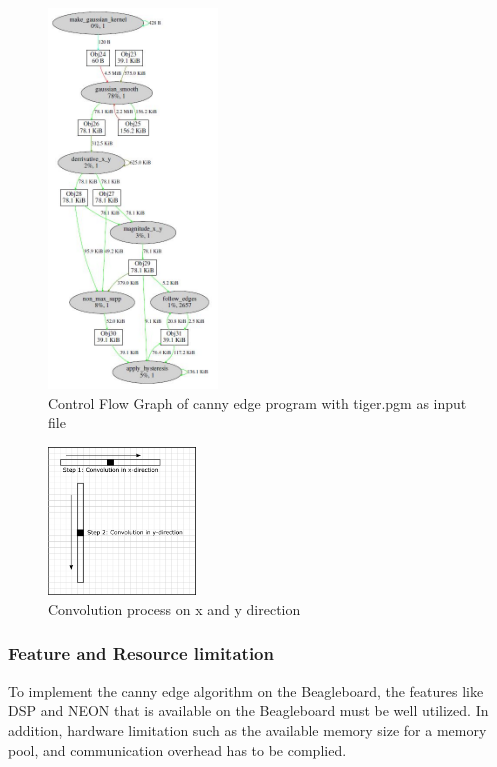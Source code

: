 \documentclass[conference]{IEEEtran}
\begin{document}
\begin{figure}[!ht]
	    \centering
	    \includegraphics[width=0.4\textwidth]{pic/com_tiger.JPG}
   	\caption{Control Flow Graph of canny edge program with tiger.pgm as input file}
   	\label{fig:profile2}
   \end{figure} 

\begin{figure}[!ht]
    \centering
    \includegraphics[width=0.35\textwidth]{pic/convol}
   \caption{Convolution process on x and y direction}
   \label{fig:convol}
\end{figure}

\subsubsection{Feature and Resource limitation}
To implement the canny edge algorithm on the Beagleboard, the features like DSP and NEON that is available on the Beagleboard must be well utilized. In addition, hardware limitation such as the available memory size for a memory pool, and communication overhead has to be complied.
\end{document}
